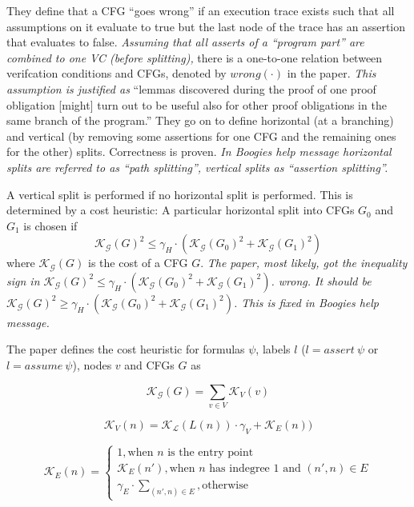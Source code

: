 \documentclass{scrartcl}
\begin{document}
They define that a CFG \enquote{goes wrong} if an execution trace exists
such that all assumptions on it evaluate to true but the last node of the trace has an assertion
that evaluates to false.
\textit{Assuming that all asserts of a \enquote{program part} are combined to one VC
(before splitting),}
there is a one-to-one relation between verifcation conditions and CFGs,
denoted by \(wrong(\cdot)\) in the paper.
\textit{This assumption is justified as }
\enquote{lemmas discovered during the proof of one proof obligation [might] turn out to be useful    
also for other proof obligations in the same branch of the program.}
They go on to define horizontal (at a branching) and vertical
(by removing some assertions for one CFG and the remaining ones for the other) splits.
Correctness is proven.
\textit{In Boogies help message horizontal splits are referred to as \enquote{path splitting},
    vertical splits as \enquote{assertion splitting}.}


A vertical split is performed if no horizontal split is performed.
This is determined by a cost heuristic:
A particular horizontal split into CFGs \(G_0\) and \(G_1\) is chosen if 
\[
    \mathcal{K}_\mathcal{G}(G)^2 \le \gamma_H
    \cdot (\mathcal{K}_\mathcal{G}(G_0)^2 + \mathcal{K}_\mathcal{G}(G_1)^2)
\]
where \(\mathcal{K}_\mathcal{G}(G)\) is the cost of a CFG \(G\).
\textit{The paper, most likely, got the inequality sign in
    \(\mathcal{K}_\mathcal{G}(G)^2 \le \gamma_H
    \cdot (\mathcal{K}_\mathcal{G}(G_0)^2 + \mathcal{K}_\mathcal{G}(G_1)^2)\).
    wrong. It should be
    \(\mathcal{K}_\mathcal{G}(G)^2 \ge \gamma_H
    \cdot (\mathcal{K}_\mathcal{G}(G_0)^2 + \mathcal{K}_\mathcal{G}(G_1)^2)\).
    This is fixed in Boogies help message.
}

The paper defines the cost heuristic for formulas \(\psi\),
labels \(l\) (\(l = assert\ \psi\) or \(l = assume\ \psi\)),
nodes \(v\) and CFGs \(G\) as

\[\mathcal{K}_\mathcal{G}(G) = \sum_{v\in V} \mathcal{K}_V(v)\]
        
\[\mathcal{K}_V(n) = \mathcal{K}_\mathcal{L}(L(n)) \cdot \gamma_V + \mathcal{K}_E(n))\]
    
\[\mathcal{K}_E(n) =
    \begin{cases}
        1, \text{when \(n\) is the entry point}\\
        \mathcal{K}_E(n'), \text{when \(n\) has indegree 1 and \((n', n) \in E\)}\\
        \gamma_E \cdot \sum_{(n', n) \in E}, \text{otherwise}
    \end{cases}
\]
\end{document}
